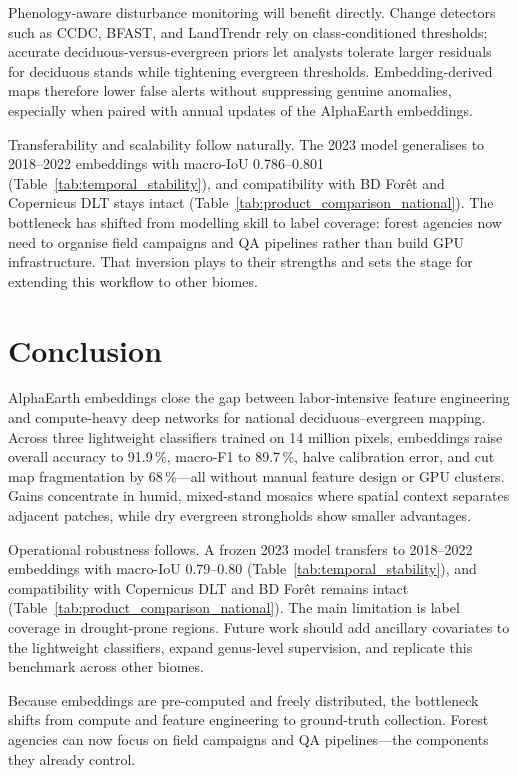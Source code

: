 \documentclass[utf8]{FrontiersinHarvard}
\begin{document}
Phenology-aware disturbance monitoring will benefit directly. Change detectors such as CCDC, BFAST, and LandTrendr rely on class-conditioned thresholds; accurate deciduous-versus-evergreen priors let analysts tolerate larger residuals for deciduous stands while tightening evergreen thresholds. Embedding-derived maps therefore lower false alerts without suppressing genuine anomalies, especially when paired with annual updates of the AlphaEarth embeddings.

Transferability and scalability follow naturally. The 2023 model generalises to 2018–2022 embeddings with macro-IoU 0.786–0.801 (Table~\ref{tab:temporal_stability}), and compatibility with BD Forêt and Copernicus DLT stays intact (Table~\ref{tab:product_comparison_national}). The bottleneck has shifted from modelling skill to label coverage: forest agencies now need to organise field campaigns and QA pipelines rather than build GPU infrastructure. That inversion plays to their strengths and sets the stage for extending this workflow to other biomes.

\section{Conclusion}

AlphaEarth embeddings close the gap between labor-intensive feature engineering and compute-heavy deep networks for national deciduous--evergreen mapping. Across three lightweight classifiers trained on 14 million pixels, embeddings raise overall accuracy to 91.9\,\%, macro-F1 to 89.7\,\%, halve calibration error, and cut map fragmentation by 68\,\%—all without manual feature design or GPU clusters. Gains concentrate in humid, mixed-stand mosaics where spatial context separates adjacent patches, while dry evergreen strongholds show smaller advantages.

Operational robustness follows. A frozen 2023 model transfers to 2018--2022 embeddings with macro-IoU 0.79--0.80 (Table~\ref{tab:temporal_stability}), and compatibility with Copernicus DLT and BD Forêt remains intact (Table~\ref{tab:product_comparison_national}). The main limitation is label coverage in drought-prone regions. Future work should add ancillary covariates to the lightweight classifiers, expand genus-level supervision, and replicate this benchmark across other biomes.

Because embeddings are pre-computed and freely distributed, the bottleneck shifts from compute and feature engineering to ground-truth collection. Forest agencies can now focus on field campaigns and QA pipelines—the components they already control.
\end{document}
